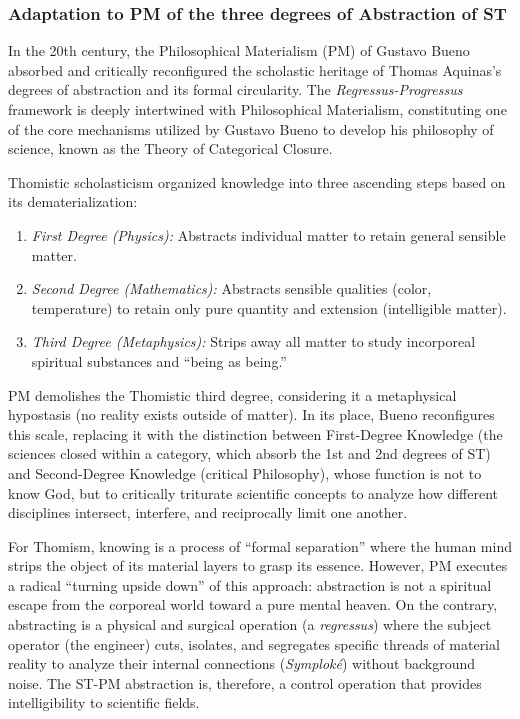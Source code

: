 \documentclass[11pt, a4paper]{article}
\begin{document}
\subsubsection{Adaptation to PM of the three degrees of Abstraction of ST}

In the 20th century, the Philosophical Materialism (PM) of \textrm{Gustavo Bueno} absorbed and critically reconfigured the scholastic heritage of Thomas Aquinas's degrees of abstraction and its formal circularity.
The \textit{Regressus-Progressus} framework is deeply intertwined with Philosophical Materialism, constituting one of the core mechanisms utilized by Gustavo Bueno to develop his philosophy of science, known as the Theory of Categorical Closure.

Thomistic scholasticism organized knowledge into three ascending steps based on its dematerialization:
\begin{enumerate}
\item \textit{First Degree (Physics):} Abstracts individual matter to retain general sensible matter.
\item \textit{Second Degree (Mathematics):} Abstracts sensible qualities (color, temperature) to retain only pure quantity and extension (intelligible matter).
\item \textit{Third Degree (Metaphysics):} Strips away all matter to study incorporeal spiritual substances and ``being as being.''
	\end{enumerate}

PM demolishes the Thomistic third degree, considering it a metaphysical hypostasis (no reality exists outside of matter). In its place, Bueno reconfigures this scale, replacing it with the distinction between \textrm{First-Degree Knowledge} (the sciences closed within a category, which absorb the 1st and 2nd degrees of ST) and \textrm{Second-Degree Knowledge} (critical Philosophy), whose function is not to know God, but to critically triturate scientific concepts to analyze how different disciplines intersect, interfere, and reciprocally limit one another.



For Thomism, knowing is a process of ``formal separation'' where the human mind strips the object of its material layers to grasp its essence. However, PM executes a radical ``turning upside down'' of this approach: abstraction is not a spiritual escape from the corporeal world toward a pure mental heaven. On the contrary, abstracting is a physical and surgical operation (a \textit{regressus}) where the subject operator (the engineer) cuts, isolates, and segregates specific threads of material reality to analyze their internal connections (\textit{Symploké}) without background noise. The ST-PM abstraction is, therefore, a control operation that provides intelligibility to scientific fields.
\end{document}
